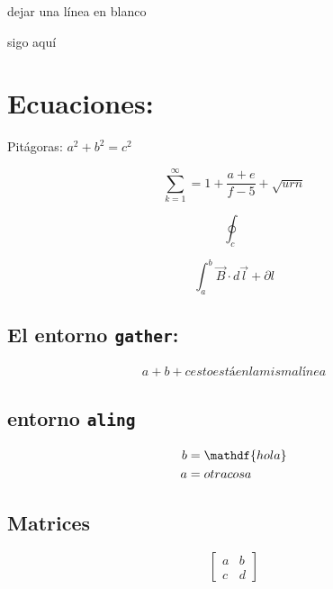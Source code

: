\documentclass[11]{article} %
\begin{document}
dejar una línea en blanco

sigo aquí

\newpage


\section{\huge Ecuaciones:}

Pitágoras: $a^2 +b ^2 = c^ 2$

\begin{equation}
    \sum_{k=1}^{\infty} = 1 + \frac{a + e}{f-5} + \sqrt{urn}
\end{equation}

\begin{equation}
    \oint_{c}
\end{equation}

\begin{equation}
    \int_a^b \vec B \cdot d \vec l + \partial l
\end{equation}

\subsection{El entorno \texttt{gather}:}


\begin{gather*}
    a + b + c
    esto está en la misma línea
\end{gather*}

\subsection{entorno \texttt{aling}}

\begin{align*}
    b &= \mathdf{hola}\\
    a &= otra cosa
\end{align*}


\subsection{Matrices}


\begin{equation}
    \label{ecuacion a}
    \begin{bmatrix}
    a & b \\
    c & d 
    \end{bmatrix}
\end{equation}
\end{document}
